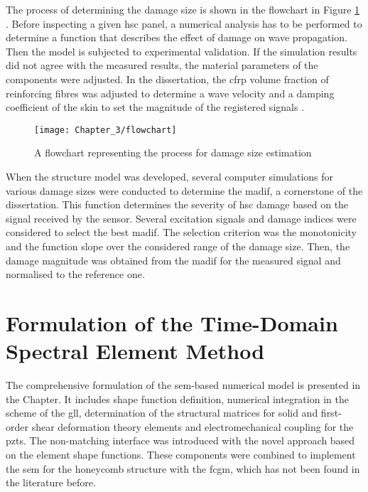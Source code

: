 \documentclass[11pt,a4paper,final]{report}
\theoremstyle{plain}
\begin{document}
The process of determining the damage size is shown in the flowchart in Figure \ref{fig:Flowchart} \cite{fiborek2021model}.
Before inspecting a given \ac{hsc} panel, a numerical analysis has to be performed to determine a function that describes the effect of damage on wave propagation.
Then the model is subjected to experimental validation.
If the simulation results did not agree with the measured results, the material parameters of the components were adjusted.
In the dissertation, the \ac{cfrp} volume fraction of reinforcing fibres was adjusted to determine a wave velocity \cite{kudela2007modelling} and a damping coefficient of the skin to set the magnitude of the registered signals \cite{wandowski2017guided}.
\begin{figure}[H]
	\begin{center}
		\texttt{[image: Chapter\_3/flowchart]}
	\end{center}
	\caption{A flowchart representing the process for damage size estimation}
	\label{fig:Flowchart}
\end{figure}

When the structure model was developed, several computer simulations for various damage sizes were conducted to determine the \ac{madif}, a cornerstone of the dissertation. This function determines the severity of \ac{hsc} damage based on the signal received by the sensor.
Several excitation signals and damage indices were considered to select the best \ac{madif}.
The selection criterion was the monotonicity and the function slope over the considered range of the damage size. Then, the damage magnitude was obtained from the \ac{madif} for the measured signal and normalised to the reference one. 

\clearpage{}
\clearpage{}

\chapter{Formulation of the Time-Domain Spectral Element Method}
\label{ch:sem}
The comprehensive formulation of the \ac{sem}-based numerical model is presented in the Chapter.
It includes shape function definition, numerical integration in the scheme of the \ac{gll}, determination of the structural matrices for solid and first-order shear deformation theory elements and electromechanical coupling for the \acp{pzt}.
The non-matching interface was introduced with the novel approach based on the element shape functions.
These components were combined to implement the \ac{sem} for the honeycomb structure with the \ac{fcgm}, which has not been found in the literature before.
\end{document}
